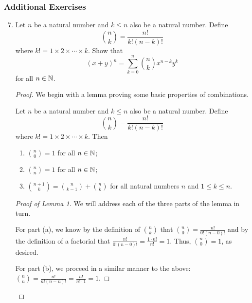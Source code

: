 \documentclass[../main.tex]{subfiles}
\begin{document}
\subsubsection*{Additional Exercises}
\begin{enumerate}
    \setcounter{enumi}{6}
    \item {}Let $n$ be a natural number and $k\leq n$ also be a natural number. Define
    \begin{equation*}
        \binom{n}{k} = \frac{n!}{k!(n-k)!}
    \end{equation*}
    where $k!=1\times 2\times\cdots\times k$. Show that
    \begin{equation*}
        (x+y)^n = \sum_{k=0}^n\binom{n}{k}x^{n-k}y^k
    \end{equation*}
    for all $n\in\mathbb{N}$.\par
    \begin{proof}
        We begin with a lemma proving some basic properties of combinations.
        \setcounter{theorem}{0}
        \begin{lemma*}
            Let $n$ be a natural number and $k\leq n$ also be a natural number. Define
            \begin{equation*}
                \binom{n}{k} = \frac{n!}{k!(n-k)!}
            \end{equation*}
            where $k!=1\times 2\times\cdots\times k$. Then
            \begin{enumerate}[label={\alph*\textup{)}}]
                \item $\binom{n}{0}=1$ for all $n\in\mathbb{N}$;
                \item $\binom{n}{n}=1$ for all $n\in\mathbb{N}$;
                \item $\binom{n+1}{k}=\binom{n}{k-1}+\binom{n}{k}$ for all natural numbers $n$ and $1\leq k\leq n$.
            \end{enumerate}
            \begin{proof}[Proof of Lemma 1]
                We will address each of the three parts of the lemma in turn.\par
                For part (a), we know by the definition of $\binom{n}{k}$ that $\binom{n}{0}=\frac{n!}{0!(n-0)!}$ and by the definition of a factorial that $\frac{n!}{0!(n-0)!}=\frac{1\cdot n!}{n!}=1$. Thus, $\binom{n}{0}=1$, as desired.\par
                For part (b), we proceed in a similar manner to the above: $\binom{n}{n}=\frac{n!}{n!(n-n)!}=\frac{n!}{n!\cdot 1}=1$.\par

\end{proof}
\end{lemma*}
\end{proof}
\end{enumerate}
\end{document}
